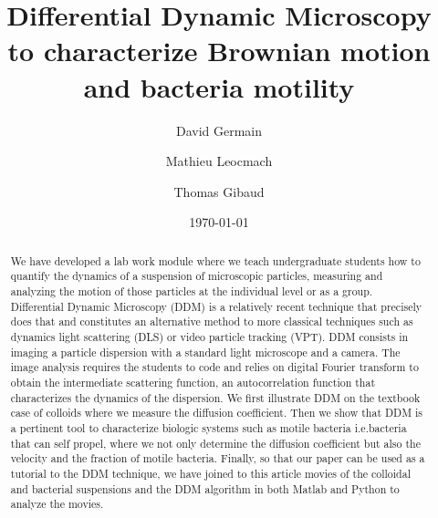 \documentclass[prb,reprint,amsmath,amssymb]{revtex4-1}
\newcommand{\tg}[1]{{\color{magenta}#1}} %
\begin{document}

\title[Differential Dynamic Microscopy to characterize Brownian motion and bacteria motility]{Differential Dynamic Microscopy\\ to characterize Brownian motion and bacteria motility}%

\author{David Germain}
\author{Mathieu Leocmach}
\author{Thomas Gibaud}

\date{\today}%

\begin{abstract}
We have developed a lab work module where we teach undergraduate students how to quantify the dynamics of a suspension of microscopic particles, measuring and analyzing the motion of those particles at the individual level or as a group. 
Differential Dynamic Microscopy (DDM) is a relatively recent technique that precisely does that and constitutes an alternative method to more classical techniques such as dynamics light scattering (DLS) or video particle tracking (VPT). DDM consists in imaging a particle dispersion with a standard light microscope and a camera. The image analysis requires the students to code and relies on digital Fourier transform to obtain the intermediate scattering function, an autocorrelation function that characterizes the dynamics of the dispersion. We first illustrate DDM on the textbook case of colloids where we measure the diffusion coefficient. Then we show that DDM is a pertinent tool to characterize biologic systems such as motile bacteria \tg{i.e.bacteria that can self propel}, where we not only determine the diffusion coefficient but also the velocity and the fraction of motile bacteria. Finally, so that  our paper can be used as a tutorial to the DDM technique, we have joined to this article movies of the colloidal and bacterial suspensions and the DDM algorithm in both Matlab and Python to analyze the movies.
\end{abstract}

\maketitle
\end{document}
